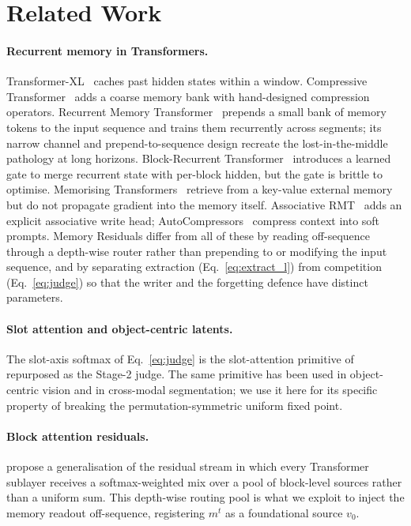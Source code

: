 \documentclass[11pt]{article}
\newcommand{\mt}{m^t}
\begin{document}
\section{Related Work}
\label{sec:related}

\paragraph{Recurrent memory in Transformers.}
Transformer-XL~\citep{daiTransformerXL2019} caches past hidden states
within a window. Compressive Transformer~\citep{rae2019compressive}
adds a coarse memory bank with hand-designed compression operators.
Recurrent Memory Transformer~\citep{bulatov2022rmt} prepends a small
bank of memory tokens to the input sequence and trains them
recurrently across segments; its narrow channel and prepend-to-sequence
design recreate the lost-in-the-middle pathology at long horizons.
Block-Recurrent Transformer~\citep{hutchins2022blockrecurrent}
introduces a learned gate to merge recurrent state with per-block
hidden, but the gate is brittle to optimise.
Memorising Transformers~\citep{wu2022memorising} retrieve from a
key-value external memory but do not propagate gradient into the
memory itself.
Associative RMT~\citep{rodkin2024armt} adds an explicit associative
write head; AutoCompressors~\citep{chevalier2023adapting} compress
context into soft prompts. Memory Residuals differ from all of these
by reading off-sequence through a depth-wise router rather than
prepending to or modifying the input sequence, and by separating
extraction (Eq.~\ref{eq:extract_l}) from competition
(Eq.~\ref{eq:judge}) so that the writer and the forgetting defence
have distinct parameters.

\paragraph{Slot attention and object-centric latents.}
The slot-axis softmax of Eq.~\ref{eq:judge} is the slot-attention
primitive of \citet{locatello2020slot} repurposed as the Stage-2
judge. The same primitive has been used in object-centric vision and
in cross-modal segmentation; we use it here for its specific property
of breaking the permutation-symmetric uniform fixed point.

\paragraph{Block attention residuals.}
\citet{du2026attention} propose a generalisation of the residual
stream in which every Transformer sublayer receives a
softmax-weighted mix over a pool of block-level sources rather than a
uniform sum. This depth-wise routing pool is what we exploit to
inject the memory readout off-sequence, registering $\mt$ as a
foundational source $v_0$.
\end{document}
